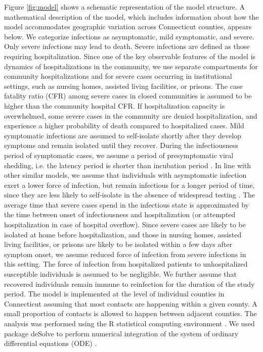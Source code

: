 \documentclass[11pt]{article}
\begin{document}
Figure \ref{fig:model} shows a schematic representation of the model structure. A mathematical description of the model, which includes information about how the model accommodates geographic variation across Connecticut counties, appears below.  We categorize infections as asymptomatic, mild symptomatic, and severe. Only severe infections may lead to death. Severe infections are defined as those requiring hospitalization. Since one of the key observable features of the model is dynamics of hospitalizations in the community, we use separate compartments for community hospitalizations and for severe cases occurring in institutional settings, such as nursing homes, assisted living facilities, or prisons. The case fatality ratio (CFR) among severe cases in closed communities is assumed to be higher than the community hospital CFR.  If hospitalization capacity is overwhelmed, some severe cases in the community are denied hospitalization, and experience a higher probability of death compared to hospitalized cases. Mild symptomatic infections are assumed to self-isolate shortly after they develop symptoms and remain isolated until they recover. During the infectiousness period of symptomatic cases, we assume a period of presymptomatic viral shedding, i.e. the latency period is shorter than incubation period \citep{furukawa2020evidence, liu2020contribution, he2020temporal}. In line with other similar models, we assume that individuals with asymptomatic infection exert a lower force of infection, but remain infectious for a longer period of time, since they are less likely to self-isolate in the absence of widespread testing \citep{ferguson2020impact, childs2020impact, salomon2020defining}.  The average time that severe cases spend in the infectious state is approximated by the time between onset of infectiousness and hospitalization (or attempted hospitalization in case of hospital overflow). Since severe cases are likely to be isolated at home before hospitalization, and those in nursing homes, assisted living facilities, or prisons are likely to be isolated within a few days after symptom onset, we assume reduced force of infection from severe infections in this setting. 
The force of infection from hospitalized patients to unhospitalized susceptible individuals is assumed to be negligible. We further assume that recovered individuals remain immune to reinfection for the duration of the study period.  The model is implemented at the level of individual counties in Connecticut assuming that most contacts are happening within a given county. A small proportion of contacts is allowed to happen between adjacent counties.  The analysis was performed using the R statistical computing environment \citep{R2020}. We used package deSolve to perform numerical integration of the system of ordinary differential equations (ODE) \citep{deSolve}.
\end{document}
